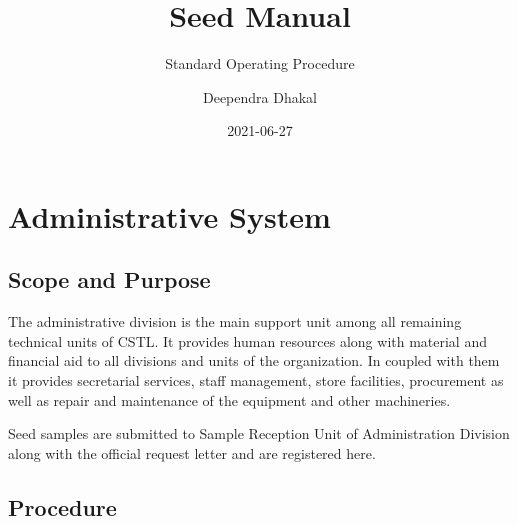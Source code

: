 \documentclass[]{book}
\title{Seed Manual}
\subtitle{Standard Operating Procedure}
\author{Deependra Dhakal}
\date{2021-06-27}
\begin{document}
\maketitle

{
\setcounter{tocdepth}{1}
\tableofcontents
}
\chapter{Administrative System}\label{adminsys}

\section{Scope and Purpose}\label{scope-and-purpose}

The administrative division is the main support unit among all remaining
technical units of CSTL. It provides human resources along with material
and financial aid to all divisions and units of the organization. In
coupled with them it provides secretarial services, staff management,
store facilities, procurement as well as repair and maintenance of the
equipment and other machineries.

Seed samples are submitted to Sample Reception Unit of Administration
Division along with the official request letter and are registered here.

\section{Procedure}\label{procedure}
\end{document}
